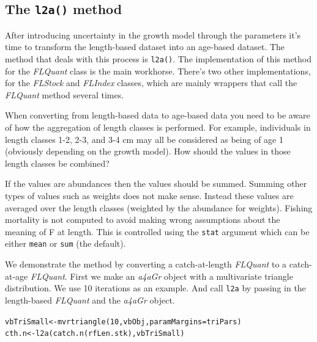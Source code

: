 \documentclass[a4paper,english,10pt]{article}\usepackage[]{graphicx}\usepackage[]{color}
\makeatletter
\newcommand{\hlnum}[1]{\textcolor[rgb]{0.2,0.2,0.2}{#1}}%
\newcommand{\hlstd}[1]{\textcolor[rgb]{0,0,0}{#1}}%
\newcommand{\hlkwb}[1]{\textcolor[rgb]{0.361,0.506,0.596}{#1}}%
\newcommand{\hlkwc}[1]{\textcolor[rgb]{0.361,0.506,0.596}{#1}}%
\newcommand{\hlkwd}[1]{\textcolor[rgb]{0.361,0.506,0.596}{#1}}%
\newenvironment{kframe}{%
 \def\at@end@of@kframe{}%
 \ifinner\ifhmode%
  \def\at@end@of@kframe{\end{minipage}}%
  \begin{minipage}{\columnwidth}%
 \fi\fi%
 \def\FrameCommand##1{\hskip\@totalleftmargin \hskip-\fboxsep
 \colorbox{shadecolor}{##1}\hskip-\fboxsep
     \hskip-\linewidth \hskip-\@totalleftmargin \hskip\columnwidth}%
 \MakeFramed {\advance\hsize-\width
   \@totalleftmargin\z@ \linewidth\hsize
   \@setminipage}}%
 {\par\unskip\endMakeFramed%
 \at@end@of@kframe}
\newenvironment{knitrout}{}{} %
\newcommand{\code}[1]{{\texttt{#1}}}
\newcommand{\class}[1]{{\textit{#1}}}
\makeatother
\begin{document}
\subsection{The \code{l2a()} method}

After introducing uncertainty in the growth model through the parameters it's time to transform the length-based dataset into an age-based dataset. The method that deals with this process is \code{l2a()}. The implementation of this method for the \class{FLQuant} class is the main workhorse. There's two other implementations, for the \class{FLStock} and \class{FLIndex} classes, which are mainly wrappers that call the \class{FLQuant} method several times.

When converting from length-based data to age-based data you need to be aware of how the aggregation of length classes is performed. For example, individuals in length classes 1-2, 2-3, and 3-4 cm may all be considered as being of age 1 (obviously depending on the growth model). How should the values in those length classes be combined?

If the values are abundances then the values should be summed. Summing other types of values such as weights does not make sense. Instead these values are averaged over the length classes (weighted by the abundance for weights). Fishing mortality is not computed to avoid making wrong assumptions about the meaning of F at length. This is controlled using the \code{stat} argument which can be either \code{mean} or \code{sum} (the default).

We demonstrate the method by converting a catch-at-length \class{FLQuant} to a catch-at-age \class{FLQuant}. First we make an \class{a4aGr} object with a multivariate triangle distribution. We use 10 iterations as an example. And call \code{l2a} by passing in the length-based \class{FLQuant} and the \class{a4aGr} object.

\begin{knitrout}
\color{fgcolor}\begin{kframe}
\begin{alltt}
\hlstd{vbTriSmall} \hlkwb{<-} \hlkwd{mvrtriangle}\hlstd{(}\hlnum{10}\hlstd{, vbObj,} \hlkwc{paramMargins} \hlstd{= triPars)}
\hlstd{cth.n} \hlkwb{<-} \hlkwd{l2a}\hlstd{(}\hlkwd{catch.n}\hlstd{(rfLen.stk), vbTriSmall)}
\end{alltt}
\end{kframe}
\end{knitrout}
\end{document}
